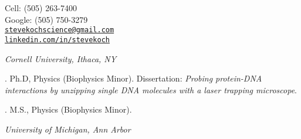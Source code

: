 \documentclass[11pt]{article}
\makeatletter
\def\myemail{stevekochscience@gmail.com}
\def\myweb{http://www.linkedin.com/in/stevekoch/}
\def\mycell{(505) 263-7400}
\def\mygoogle{(505) 750-3279}
\makeatother
\begin{document}
\begin{minipage}[t]{2.95in}
  
\end{minipage}
\hfill     
\hfill
\begin{minipage}[t]{1.7in}
  \flushright \footnotesize Cell: \mycell \\ 
  Google: \mygoogle  \\ 
  {\scriptsize  \texttt{\href{mailto:\myemail}{\myemail}}} \\
  {\scriptsize  \texttt{\href{\myweb}{linkedin.com/in/stevekoch}}}
\end{minipage}


\medskip

\reversemarginpar

\medskip       



\noindent\emph{Cornell University, Ithaca, NY \vspace{0.01in}}

. Ph.D, Physics (Biophysics Minor). Dissertation: \emph{Probing protein-DNA interactions by unzipping single DNA molecules with a laser trapping microscope}. %



. M.S., Physics (Biophysics Minor). 


\medskip
\noindent\emph{University of Michigan, Ann Arbor\vspace{0.02in}}
\end{document}
